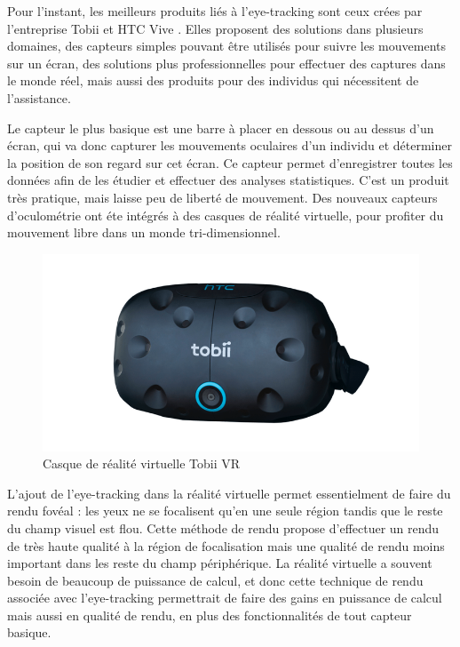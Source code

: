 \documentclass[12pt]{article}
\begin{document}
Pour l'instant, les meilleurs produits liés à l'eye-tracking sont ceux crées
par l'entreprise Tobii \cite{tobii} et HTC Vive \cite{htc_vive_pro_eye}. Elles
proposent des solutions dans plusieurs domaines, des capteurs simples pouvant
être utilisés pour suivre les mouvements sur un écran, des solutions plus
professionnelles pour effectuer des captures dans le monde réel, mais aussi des
produits pour des individus qui nécessitent de l'assistance.

\bigskip
Le capteur le plus basique est une barre à placer en dessous ou au dessus d'un
écran, qui va donc capturer les mouvements oculaires d'un individu et déterminer
la position de son regard sur cet écran. Ce capteur permet d'enregistrer toutes
les données afin de les étudier et effectuer des analyses statistiques. C'est un
produit très pratique, mais laisse peu de liberté de mouvement. Des nouveaux
capteurs d'oculométrie ont éte intégrés à des casques de réalité virtuelle,
pour profiter du mouvement libre dans un monde tri-dimensionnel.

\begin{figure}[htpb]
  \includegraphics[width=\textwidth,keepaspectratio=true]{tobiivr.png}
  \caption{Casque de réalité virtuelle Tobii VR}
\end{figure}

L'ajout de l'eye-tracking dans la réalité virtuelle permet essentielment de
faire du rendu fovéal \cite{wiki:foveated_rendering} : les yeux ne se
focalisent qu'en une seule région tandis que le reste du champ visuel est flou.
Cette méthode de rendu propose d'effectuer un rendu de très haute qualité à la
région de focalisation mais une qualité de rendu moins important dans les reste
du champ périphérique. La réalité virtuelle a souvent besoin de beaucoup de
puissance de calcul, et donc cette technique de rendu associée avec
l'eye-tracking permettrait de faire des gains en puissance de calcul mais aussi
en qualité de rendu, en plus des fonctionnalités de tout capteur basique.
\end{document}
